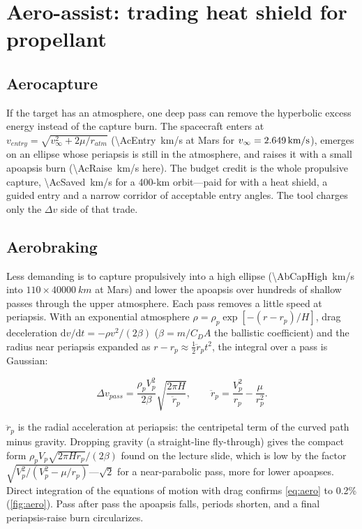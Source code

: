 \documentclass[11pt,letterpaper,oneside]{report}
\newcommand{\dv}{\Delta v}
\newcommand{\vinf}{v_\infty}
\newcommand{\dd}{\mathrm{d}}
\begin{document}
\chapter{Aero-assist: trading heat shield for propellant}\label{ch:aero}

\section{Aerocapture}
If the target has an atmosphere, one deep pass can remove the hyperbolic excess energy instead
of the capture burn. The spacecraft enters at
$v_{entry}=\sqrt{\vinf^2+2\mu/r_{atm}}$ (\SI{\AcEntry}{km/s} at Mars for $\vinf=\SI{\EMvinfarr}{km/s}$),
emerges on an ellipse whose periapsis is still in the atmosphere, and raises it with a small
apoapsis burn (\SI{\AcRaise}{km/s} here). The budget credit is the whole propulsive capture,
\SI{\AcSaved}{km/s} for a 400-km orbit---paid for with a heat shield, a guided entry and a narrow
corridor of acceptable entry angles. The tool charges only the $\dv$ side of that trade.

\section{Aerobraking}
Less demanding is to capture propulsively into a high ellipse (\SI{\AbCapHigh}{km/s} into
$110\times\SI{40000}{km}$ at Mars) and lower the apoapsis over hundreds of shallow passes through
the upper atmosphere. Each pass removes a little speed at periapsis. With an exponential
atmosphere $\rho=\rho_p\exp[-(r-r_p)/H]$, drag deceleration $\dd v/\dd t=-\rho v^2/(2\beta)$
($\beta=m/C_DA$ the ballistic coefficient) and the radius near periapsis expanded as
$r-r_p\approx\tfrac12\ddot r_pt^2$, the integral over a pass is Gaussian:
\begin{keyresult}
\begin{equation}
  \dv_{pass}=\frac{\rho_pV_p^2}{2\beta}\sqrt{\frac{2\pi H}{\ddot r_p}},\qquad
  \ddot r_p=\frac{V_p^2}{r_p}-\frac{\mu}{r_p^2}.
  \label{eq:aero}
\end{equation}
\end{keyresult}
$\ddot r_p$ is the radial acceleration at periapsis: the centripetal term of the curved path minus
gravity. Dropping gravity (a straight-line fly-through) gives the compact form
$\rho_pV_p\sqrt{2\pi Hr_p}/(2\beta)$ found on the lecture slide, which is low by the factor
$\sqrt{V_p^2/(V_p^2-\mu/r_p)}$---$\sqrt2$ for a near-parabolic pass, more for lower apoapses.
Direct integration of the equations of motion with drag confirms \cref{eq:aero} to 0.2\%
(\cref{fig:aero}). Pass after pass the apoapsis falls, periods shorten, and a final periapsis-raise
burn circularizes.
\end{document}
